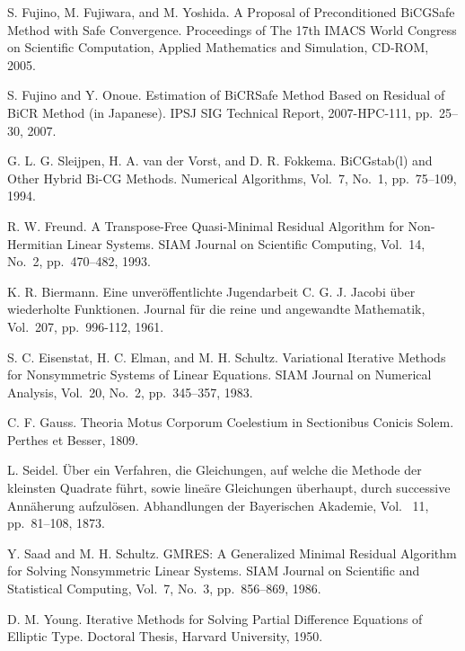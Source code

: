 \documentclass[a4paper]{jarticle}
\begin{document}
{{\begin{thebibliography}{10}
S. Fujino, M. Fujiwara, and M. Yoshida.
\newblock A Proposal of Preconditioned BiCGSafe Method with Safe Convergence.
\newblock Proceedings of The 17th IMACS World Congress on Scientific
	Computation, Applied Mathematics and Simulation, CD-ROM, 2005.

S. Fujino and Y. Onoue.
\newblock Estimation of BiCRSafe Method Based on Residual of BiCR Method (in Japanese).
\newblock IPSJ SIG Technical Report, 2007-HPC-111, pp.\ 25--30, 2007.

G. L. G. Sleijpen, H. A. van der Vorst, and D. R. Fokkema.
\newblock BiCGstab(l) and Other Hybrid Bi-CG Methods.
\newblock Numerical Algorithms, Vol.~7, No.~1, pp.\ 75--109, 1994.

R. W. Freund.
\newblock A Transpose-Free Quasi-Minimal Residual Algorithm for
	Non-Hermitian Linear Systems.
\newblock SIAM Journal on Scientific Computing, Vol.~14, No.~2, pp.\ 470--482, 1993.

K. R. Biermann.
\newblock Eine unver\"offentlichte Jugendarbeit C. G. J. Jacobi \"uber
	wiederholte Funktionen.
\newblock Journal f\"ur die reine und angewandte Mathematik, Vol.~207, pp.\ 996-112, 1961.

S. C. Eisenstat, H. C. Elman, and M. H. Schultz.
\newblock Variational Iterative Methods for Nonsymmetric Systems of
	Linear Equations.
\newblock SIAM Journal on Numerical Analysis, Vol.~20, No.~2, pp.\ 345--357, 1983.

C. F. Gauss.
\newblock Theoria Motus Corporum Coelestium in Sectionibus Conicis Solem. 
\newblock Perthes et Besser, 1809.

L. Seidel.
\newblock \"Uber ein Verfahren, die Gleichungen, auf welche die Methode
	der kleinsten Quadrate f\"uhrt, sowie line\"are Gleichungen
	\"uberhaupt, durch successive Ann\"aherung  aufzul\"osen.
\newblock Abhandlungen der Bayerischen Akademie, Vol. ~11, pp.\ 81--108,
	1873.

Y. Saad and M. H. Schultz.
\newblock GMRES: A Generalized Minimal Residual Algorithm for Solving
	Nonsymmetric Linear Systems.
\newblock SIAM Journal on Scientific and Statistical Computing, Vol.~7, No.~3, pp.\ 856--869, 1986.

D. M. Young.
\newblock Iterative Methods for Solving Partial Difference Equations of
	Elliptic Type.
\newblock Doctoral Thesis, Harvard University, 1950.


\end{thebibliography}}}
\end{document}
